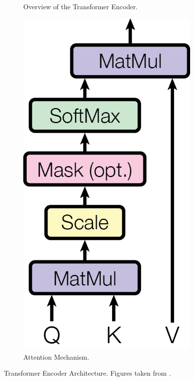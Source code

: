 \begin{figure}[htbp]
\begin{subfigure}{0.2\textwidth}
      \caption{Overview of the Transformer Encoder.}
      \label{fig:encoder}
    \end{subfigure}
    \hspace{0.2\textwidth}
    \begin{subfigure}{0.2\textwidth}
        \includegraphics[width=\textwidth]{images/Transformer//AttentionHead.png}
        \caption{Attention Mechanism.}
      \label{fig:selfattention}
    \end{subfigure}
    \caption{Transformer Encoder Architecture. Figures taken from \cite{vaswani2017attention}.}
    \label{fig:transformer}
  \end{figure}


